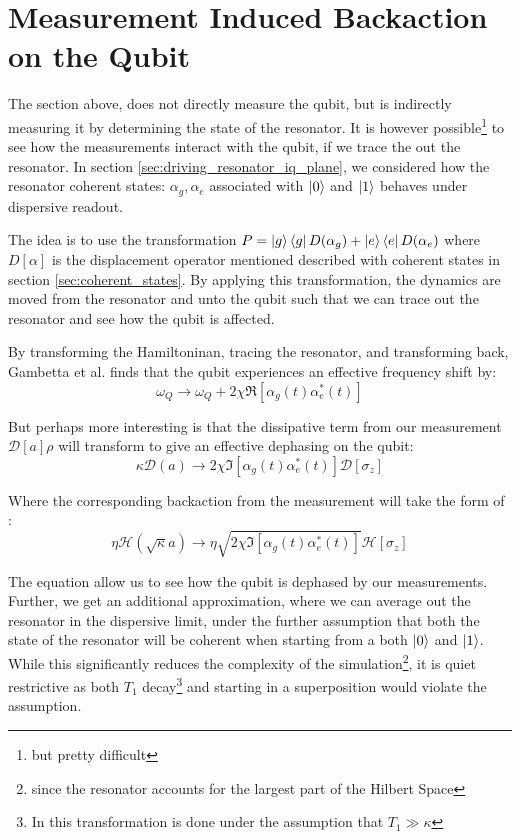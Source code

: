 \section{Measurement Induced Backaction on the Qubit}
The section above, does not directly measure the qubit, but is indirectly measuring it by determining the state of the resonator. It is however possible\footnote{but pretty difficult} to see how the measurements interact with the qubit, if we trace the out the resonator. In section \ref{sec:driving_resonator_iq_plane}, we considered how the resonator coherent states: $\alpha_g, \alpha_e$ associated with $\ket{0}$ and $\ket{1}$ behaves under dispersive readout. 

The idea is to use the transformation $P = \ket{g}\bra{g}D(\alpha_g) + \ket{e}\bra{e}D(\alpha_e)$ where $D[\alpha]$ is the displacement operator mentioned described with coherent states in section \ref{sec:coherent_states}. By applying this transformation, the dynamics are moved from the resonator and unto the qubit such that we can trace out the resonator and see how the qubit is affected. \cite{gambetta_quantum_2008}

By transforming the Hamiltoninan,  tracing the resonator, and transforming back, Gambetta et al. finds that the qubit experiences an effective frequency shift by:
\begin{equation}
    \omega_Q \to \omega_Q + 2 \chi \Re[\alpha_g(t)\alpha_e^*(t)]
\end{equation}

But perhaps more interesting is that the dissipative term from our measurement $\mathcal{D}[a]\rho$ will transform to give an effective dephasing on the qubit:
\begin{equation}
    \kappa\mathcal{D}(a) \to 2\chi \Im[\alpha_g(t)\alpha_e^*(t)] \mathcal{D}[\sigma_z]
\end{equation}

Where the corresponding backaction from the measurement will take the form of \cite{campagne-ibarcq_measurement_nodate}:
\begin{equation}
    \eta\mathcal{H}(\sqrt{\kappa} a) \to \eta \sqrt{2 \chi \Im[\alpha_g(t)\alpha_e^*(t)]} \mathcal{H}[\sigma_z]
\end{equation}

The equation allow us to see how the qubit is dephased by our measurements. Further, we get an additional approximation, where we can average out the resonator in the dispersive limit, under the further assumption that both the state of the resonator will be coherent when starting from a both $\ket{0}$ and $\ket{1}$. While this significantly reduces the complexity of the simulation\footnote{since the resonator accounts for the largest part of the Hilbert Space}, it is quiet restrictive as both $T_1$ decay\footnote{In \cite{gambetta_quantum_2008} this transformation is done under the assumption that $T_1 \gg \kappa$} and starting in a superposition would violate the assumption. 